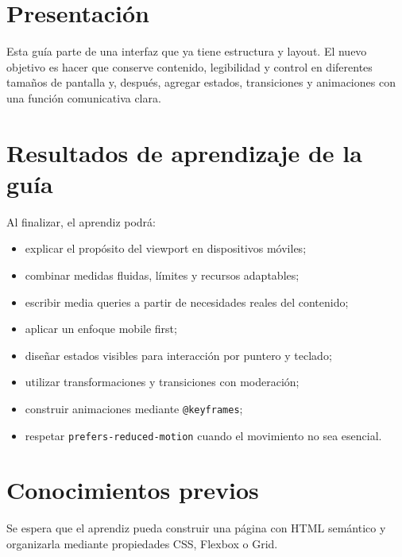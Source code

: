 \documentclass[11pt]{article}
\begin{document}
\thispagestyle{firstpage}
\GuideHeader
{}

\section{Presentación}
Esta guía parte de una interfaz que ya tiene estructura y layout. El nuevo objetivo es hacer que conserve contenido, legibilidad y control en diferentes tamaños de pantalla y, después, agregar estados, transiciones y animaciones con una función comunicativa clara.

\section*{Resultados de aprendizaje de la guía}
Al finalizar, el aprendiz podrá:
\begin{itemize}
    \item explicar el propósito del viewport en dispositivos móviles;
    \item combinar medidas fluidas, límites y recursos adaptables;
    \item escribir media queries a partir de necesidades reales del contenido;
    \item aplicar un enfoque mobile first;
    \item diseñar estados visibles para interacción por puntero y teclado;
    \item utilizar transformaciones y transiciones con moderación;
    \item construir animaciones mediante \texttt{@keyframes};
    \item respetar \texttt{prefers-reduced-motion} cuando el movimiento no sea esencial.
\end{itemize}

\section*{Conocimientos previos}
Se espera que el aprendiz pueda construir una página con HTML semántico y organizarla mediante propiedades CSS, Flexbox o Grid.


\tableofcontents
\newpage
\end{document}
